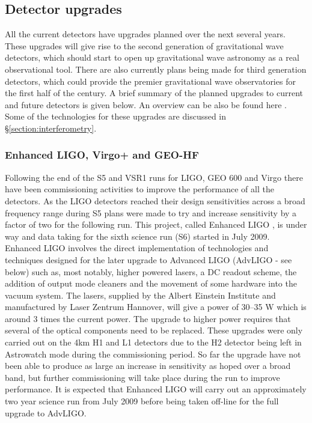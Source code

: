 \documentclass{article}
\begin{document}
\subsection{Detector upgrades}
All the current detectors have upgrades planned over the next several years.
These upgrades will give rise to the second generation of gravitational wave
detectors, which should start to open up gravitational wave astronomy as a
real observational tool. There are also currently plans being made for third
generation detectors, which could provide the premier gravitational wave
observatories for the first half of the century. A brief summary of the planned
upgrades to current and future detectors is given below. An overview can be also
be found here \cite{Whitcomb:2008}. Some of the technologies for these upgrades
are discussed in \S\ref{section:interferometry}.

\subsubsection{Enhanced LIGO, Virgo+ and GEO-HF}\label{subsection:EnLIGO}
Following the end of the S5 and VSR1 runs for LIGO, GEO 600 and Virgo there
have been commissioning activities to improve the performance of all the
detectors. As the LIGO detectors reached their design sensitivities across a
broad frequency range during S5 plans were made to try and increase sensitivity
by a factor of two for the following run. This project, called Enhanced LIGO 
\cite{EnhancedLIGO}, is under way and data taking for the sixth science run (S6) 
started in July 2009. Enhanced LIGO involves the direct implementation of technologies
and techniques designed for the later upgrade to Advanced LIGO (AdvLIGO - see
below) such as, most notably, higher powered lasers, a DC readout scheme, the
addition of output mode cleaners and the movement of some hardware into the
vacuum system. The lasers, supplied by the Albert Einstein Institute and
manufactured by Laser Zentrum Hannover, will give a power of 30--35 W which is
around 3 times the current power. The upgrade to higher power requires that
several of the optical components need to be replaced. These upgrades were only
carried out on the 4km H1 and L1 detectors due to the H2 detector being
left in Astrowatch mode during the commissioning period. So far the upgrade have
not been able to produce as large an increase in sensitivity as hoped over a 
broad band, but further commissioning will take place during the run to improve
performance. It is expected that Enhanced LIGO will carry out an approximately 
two year science run from July 2009 before being taken off-line for the full 
upgrade to AdvLIGO.
\end{document}
